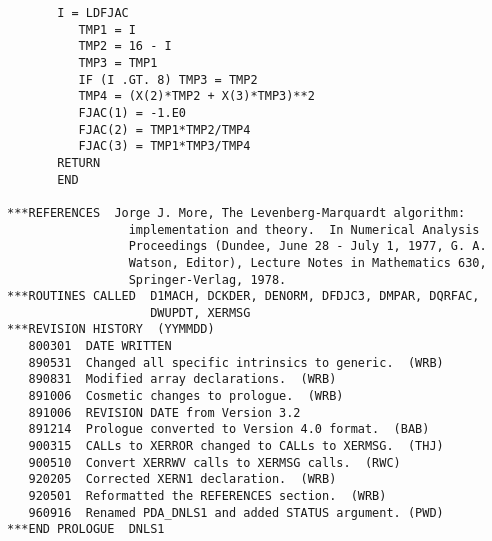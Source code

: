 \begin{verbatim}
       I = LDFJAC
          TMP1 = I
          TMP2 = 16 - I
          TMP3 = TMP1
          IF (I .GT. 8) TMP3 = TMP2
          TMP4 = (X(2)*TMP2 + X(3)*TMP3)**2
          FJAC(1) = -1.E0
          FJAC(2) = TMP1*TMP2/TMP4
          FJAC(3) = TMP1*TMP3/TMP4
       RETURN
       END

***REFERENCES  Jorge J. More, The Levenberg-Marquardt algorithm:
                 implementation and theory.  In Numerical Analysis
                 Proceedings (Dundee, June 28 - July 1, 1977, G. A.
                 Watson, Editor), Lecture Notes in Mathematics 630,
                 Springer-Verlag, 1978.
***ROUTINES CALLED  D1MACH, DCKDER, DENORM, DFDJC3, DMPAR, DQRFAC,
                    DWUPDT, XERMSG
***REVISION HISTORY  (YYMMDD)
   800301  DATE WRITTEN
   890531  Changed all specific intrinsics to generic.  (WRB)
   890831  Modified array declarations.  (WRB)
   891006  Cosmetic changes to prologue.  (WRB)
   891006  REVISION DATE from Version 3.2
   891214  Prologue converted to Version 4.0 format.  (BAB)
   900315  CALLs to XERROR changed to CALLs to XERMSG.  (THJ)
   900510  Convert XERRWV calls to XERMSG calls.  (RWC)
   920205  Corrected XERN1 declaration.  (WRB)
   920501  Reformatted the REFERENCES section.  (WRB)
   960916  Renamed PDA_DNLS1 and added STATUS argument. (PWD)
***END PROLOGUE  DNLS1
\end{verbatim}


